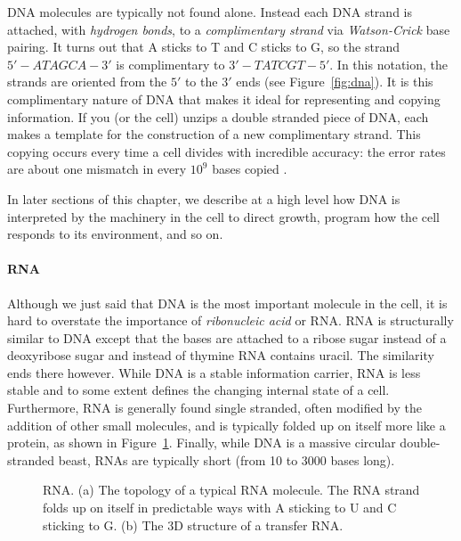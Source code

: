 DNA molecules are typically not found alone. Instead each DNA strand
is attached, with {\em hydrogen bonds}, to a {\em
  complimentary strand} via {\em Watson-Crick} base pairing. It turns
out that A sticks to T and C sticks to G, so the strand $5'-ATAGCA-3'$
is complimentary to $3'-TATCGT-5'$. In this notation, the strands are
oriented from the $5'$ to the $3'$ ends (see Figure~\ref{fig:dna}). It
is this complimentary nature of DNA that makes it ideal for
representing and copying information. If you (or the cell) unzips a
double stranded piece of DNA, each makes a template for the
construction of a new complimentary strand. This copying occurs every
time a cell divides with incredible accuracy: the error rates are
about one mismatch in every $10^9$ bases copied \cite{dna-error-rate}.

In later sections of this chapter, we describe at a high level how 
DNA is interpreted by the machinery in the cell to direct growth,
program how the cell responds to its environment, and so on.

\paragraph{RNA} Although we just said that DNA is the most
important molecule in the cell, it is hard to overstate the importance
of {\em ribonucleic acid} or RNA. RNA is structurally similar to DNA
except that the bases are attached to a ribose sugar instead of a
deoxyribose sugar and instead of thymine RNA contains uracil. The
similarity ends there however. While DNA is a stable information
carrier, RNA is less stable and to some extent defines the changing
internal state of a cell. Furthermore, RNA is generally found single
stranded, often modified by the addition of other small molecules, and
is typically folded up on itself more like a protein, as shown in
Figure~\ref{fig:rna}. Finally, while DNA is a massive circular
double-stranded beast, RNAs are typically short (from 10 to 3000 bases
long).

\begin{figure}
\caption{\label{fig:rna} RNA. (a) The topology of a typical RNA
  molecule. The RNA strand folds up on itself in predictable ways with
  A sticking to U and C sticking to G. (b) The 3D structure of a
  transfer RNA.}
\end{figure}

